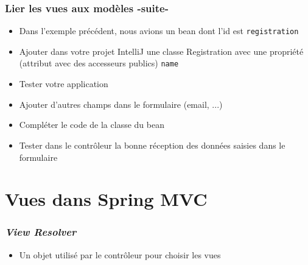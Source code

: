 \documentclass{beamer}
\begin{document}
\begin{frame}
	\frametitle{Lier les vues aux modèles -suite-}
	\begin{itemize}
\item Dans l'exemple précédent, nous avions un bean dont l'id est \texttt{registration}
\item Ajouter dans votre projet IntelliJ une classe Registration avec une propriété (attribut avec des accesseurs publics) \texttt{name}
\item Tester votre application
\item Ajouter d'autres champs dans le formulaire (email, ...)
\item Compléter le code de la classe du bean
\item Tester dans le contrôleur la bonne réception des données saisies dans le formulaire
	\end{itemize}
\end{frame}

\section{Vues dans Spring MVC}

\begin{frame}
  \frametitle{\textit{View Resolver}}
  \begin{itemize}
  	\vspace{5cm}
  \item Un objet utilisé par le contrôleur pour choisir les vues
  \end{itemize}
\end{frame}
\end{document}
